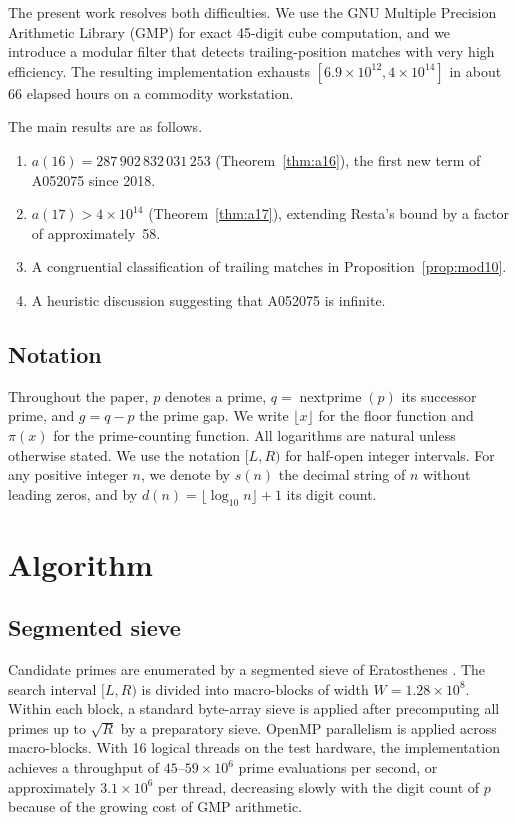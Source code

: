 \documentclass[11pt]{article}
\theoremstyle{definition}
\theoremstyle{remark}
\newcommand{\np}{\operatorname{nextprime}}
\begin{document}
The present work resolves both difficulties.
We use the GNU Multiple Precision Arithmetic Library
(GMP) \cite{GMP} for exact 45-digit cube computation, and we introduce
a modular filter that detects trailing-position matches with very high
efficiency.
The resulting implementation exhausts $[6.9 \times 10^{12},
4 \times 10^{14}]$ in about 66 elapsed hours on a commodity workstation.

The main results are as follows.
\begin{enumerate}
\item $a(16) = 287\,902\,832\,031\,253$ (Theorem~\ref{thm:a16}),
      the first new term of A052075 since 2018.
\item $a(17) > 4 \times 10^{14}$ (Theorem~\ref{thm:a17}),
      extending Resta's bound by a factor of approximately~58.
\item A congruential classification of trailing matches in
      Proposition~\ref{prop:mod10}.
\item A heuristic discussion suggesting that A052075 is infinite.
\end{enumerate}

\subsection{Notation}
\label{sec:notation}

Throughout the paper, $p$ denotes a prime, $q = \np(p)$ its successor
prime, and $g = q - p$ the prime gap.
We write $\lfloor x \rfloor$ for the floor function and $\pi(x)$ for
the prime-counting function.
All logarithms are natural unless otherwise stated.
We use the notation $[L, R)$ for half-open integer intervals.
For any positive integer $n$, we denote by $s(n)$ the decimal string
of $n$ without leading zeros, and by
$d(n) = \lfloor \log_{10} n \rfloor + 1$ its digit count.

\section{Algorithm}
\label{sec:algorithm}

\subsection{Segmented sieve}
\label{sec:sieve}

Candidate primes are enumerated by a segmented sieve of
Eratosthenes \cite{Sorenson1991}.
The search interval $[L, R)$ is divided into macro-blocks of width
$W = 1.28 \times 10^{8}$.
Within each block, a standard byte-array sieve is applied after
precomputing all primes up to $\sqrt{R}$ by a preparatory sieve.
OpenMP \cite{OpenMP} parallelism is applied across macro-blocks.
With 16 logical threads on the test hardware, the implementation
achieves a throughput of $45$--$59 \times 10^6$ prime evaluations
per second, or approximately $3.1 \times 10^6$ per thread, decreasing
slowly with the digit count of $p$ because of the growing cost of
GMP arithmetic.
\end{document}
